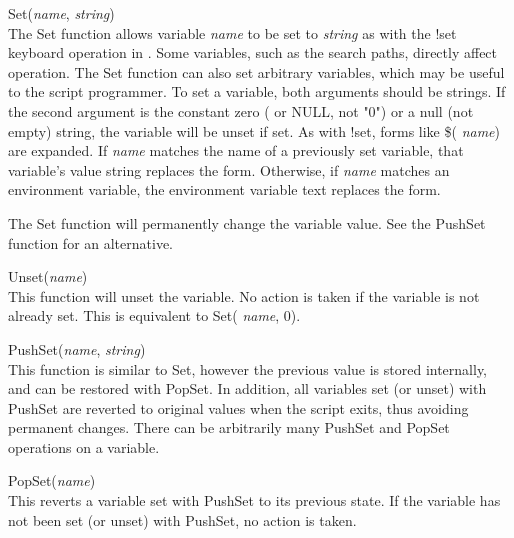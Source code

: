 \begin{description}
\item{\vt Set({\it name\/}, {\it string\/})}\\
The {\vt Set} function allows variable {\it name} to be set to {\it
string} as with the {\cb !set} keyboard operation in {\Xic}.  Some
variables, such as the search paths, directly affect {\Xic} operation. 
The {\vt Set} function can also set arbitrary variables, which may be
useful to the script programmer.  To set a variable, both arguments
should be strings.  If the second argument is the constant zero ({} or {\vt NULL}, not {\vt "0"}) or a null (not empty) string, the
variable will be unset if set.  As with {\cb !set}, forms like \$({\it
name}) are expanded.  If {\it name} matches the name of a previously
set variable, that variable's value string replaces the form. 
Otherwise, if {\it name} matches an environment variable, the
environment variable text replaces the form.

The {\vt Set} function will permanently change the variable value. 
See the {\vt PushSet} function for an alternative.

\item{\vt Unset({\it name\/})}\\
This function will unset the variable.  No action is taken if the
variable is not already set.  This is equivalent to {\vt Set}({\it
name\/}, 0).

\item{\vt PushSet({\it name\/}, {\it string\/})}\\
This function is similar to {\vt Set}, however the previous value is
stored internally, and can be restored with {\vt PopSet}.  In
addition, all variables set (or unset) with {\vt PushSet} are reverted
to original values when the script exits, thus avoiding permanent
changes.  There can be arbitrarily many {\vt PushSet} and {\vt PopSet}
operations on a variable.

\item{\vt PopSet({\it name\/})}\\
This reverts a variable set with {\vt PushSet} to its previous state. 
If the variable has not been set (or unset) with {\vt PushSet}, no
action is taken.


\end{description}
